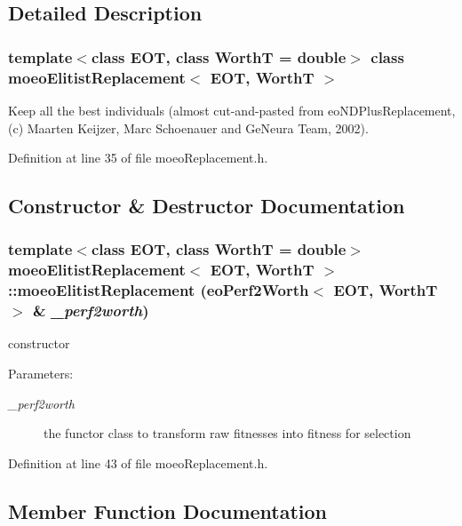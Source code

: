 \subsection{Detailed Description}
\subsubsection*{template$<$class EOT, class Worth\-T = double$>$ class moeo\-Elitist\-Replacement$<$ EOT, Worth\-T $>$}

Keep all the best individuals (almost cut-and-pasted from eo\-NDPlus\-Replacement, (c) Maarten Keijzer, Marc Schoenauer and Ge\-Neura Team, 2002). 



Definition at line 35 of file moeo\-Replacement.h.

\subsection{Constructor \& Destructor Documentation}
\subsubsection{\setlength{\rightskip}{0pt plus 5cm}template$<$class EOT, class Worth\-T = double$>$ {\bf moeo\-Elitist\-Replacement}$<$ EOT, Worth\-T $>$::{\bf moeo\-Elitist\-Replacement} (eo\-Perf2Worth$<$ EOT, Worth\-T $>$ \& {\em \_\-perf2worth})\hspace{0.3cm}{\tt  [inline]}}\label{classmoeoElitistReplacement_fa62ed508ac194ed7b720e37dd22458c}


constructor 

\begin{Desc}
\item[Parameters:]
\begin{description}
\item[{\em \_\-perf2worth}]the functor class to transform raw fitnesses into fitness for selection \end{description}
\end{Desc}


Definition at line 43 of file moeo\-Replacement.h.

\subsection{Member Function Documentation}
